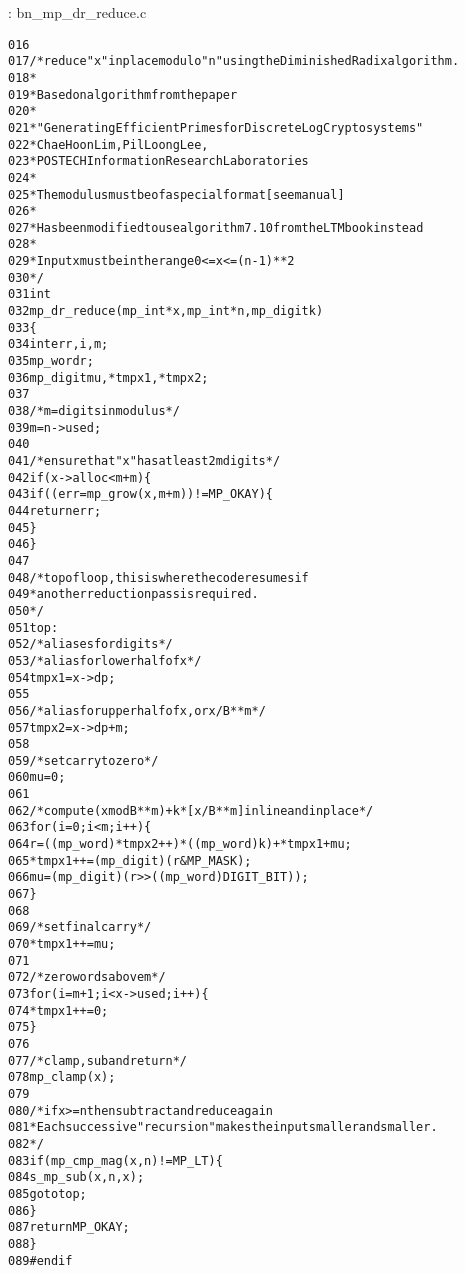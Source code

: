 \documentclass[b5paper]{book}
\begin{document}
\vspace{+3mm}\begin{small}
\hspace{-5.1mm}{\bf File}: bn\_mp\_dr\_reduce.c
\vspace{-3mm}
\begin{alltt}
016   
017   /* reduce "x" in place modulo "n" using the Diminished Radix algorithm.
018    *
019    * Based on algorithm from the paper
020    *
021    * "Generating Efficient Primes for Discrete Log Cryptosystems"
022    *                 Chae Hoon Lim, Pil Loong Lee,
023    *          POSTECH Information Research Laboratories
024    *
025    * The modulus must be of a special format [see manual]
026    *
027    * Has been modified to use algorithm 7.10 from the LTM book instead
028    *
029    * Input x must be in the range 0 <= x <= (n-1)**2
030    */
031   int
032   mp_dr_reduce (mp_int * x, mp_int * n, mp_digit k)
033   \{
034     int      err, i, m;
035     mp_word  r;
036     mp_digit mu, *tmpx1, *tmpx2;
037   
038     /* m = digits in modulus */
039     m = n->used;
040   
041     /* ensure that "x" has at least 2m digits */
042     if (x->alloc < m + m) \{
043       if ((err = mp_grow (x, m + m)) != MP_OKAY) \{
044         return err;
045       \}
046     \}
047   
048   /* top of loop, this is where the code resumes if
049    * another reduction pass is required.
050    */
051   top:
052     /* aliases for digits */
053     /* alias for lower half of x */
054     tmpx1 = x->dp;
055   
056     /* alias for upper half of x, or x/B**m */
057     tmpx2 = x->dp + m;
058   
059     /* set carry to zero */
060     mu = 0;
061   
062     /* compute (x mod B**m) + k * [x/B**m] inline and inplace */
063     for (i = 0; i < m; i++) \{
064         r         = ((mp_word)*tmpx2++) * ((mp_word)k) + *tmpx1 + mu;
065         *tmpx1++  = (mp_digit)(r & MP_MASK);
066         mu        = (mp_digit)(r >> ((mp_word)DIGIT_BIT));
067     \}
068   
069     /* set final carry */
070     *tmpx1++ = mu;
071   
072     /* zero words above m */
073     for (i = m + 1; i < x->used; i++) \{
074         *tmpx1++ = 0;
075     \}
076   
077     /* clamp, sub and return */
078     mp_clamp (x);
079   
080     /* if x >= n then subtract and reduce again
081      * Each successive "recursion" makes the input smaller and smaller.
082      */
083     if (mp_cmp_mag (x, n) != MP_LT) \{
084       s_mp_sub(x, n, x);
085       goto top;
086     \}
087     return MP_OKAY;
088   \}
089   #endif
\end{alltt}
\end{small}
\end{document}
